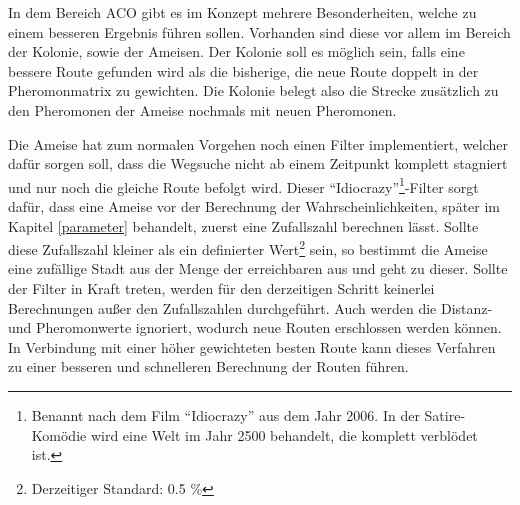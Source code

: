 {	In dem Bereich \ac{ACO} gibt es im Konzept mehrere Besonderheiten, welche zu einem besseren Ergebnis führen sollen. Vorhanden sind diese vor allem im Bereich der Kolonie, sowie der Ameisen. Der Kolonie soll es möglich sein, falls eine bessere Route gefunden wird als die bisherige, die neue Route doppelt in der Pheromonmatrix zu gewichten. Die Kolonie belegt also die Strecke zusätzlich zu den Pheromonen der Ameise nochmals mit neuen Pheromonen.
	
	Die Ameise hat zum normalen Vorgehen noch einen Filter implementiert, welcher dafür sorgen soll, dass die Wegsuche nicht ab einem Zeitpunkt komplett stagniert und nur noch die gleiche Route befolgt wird. Dieser ``Idiocrazy''\footnote{Benannt nach dem Film ``Idiocrazy'' aus dem Jahr 2006. In der Satire-Komödie wird eine Welt im Jahr 2500 behandelt, die komplett verblödet ist.}-Filter sorgt dafür, dass eine Ameise vor der Berechnung der Wahrscheinlichkeiten, später im Kapitel \ref{parameter} behandelt, zuerst eine Zufallszahl berechnen lässt. Sollte diese Zufallszahl kleiner als ein definierter Wert\footnote{Derzeitiger Standard: 0.5 \%} sein, so bestimmt die Ameise eine zufällige Stadt aus der Menge der erreichbaren aus und geht zu dieser. Sollte der Filter in Kraft treten, werden für den derzeitigen Schritt keinerlei Berechnungen außer den Zufallszahlen durchgeführt. Auch werden die Distanz- und Pheromonwerte ignoriert, wodurch neue Routen erschlossen werden können. In Verbindung mit einer höher gewichteten besten Route kann dieses Verfahren zu einer besseren und schnelleren Berechnung der Routen führen.
	
	
}